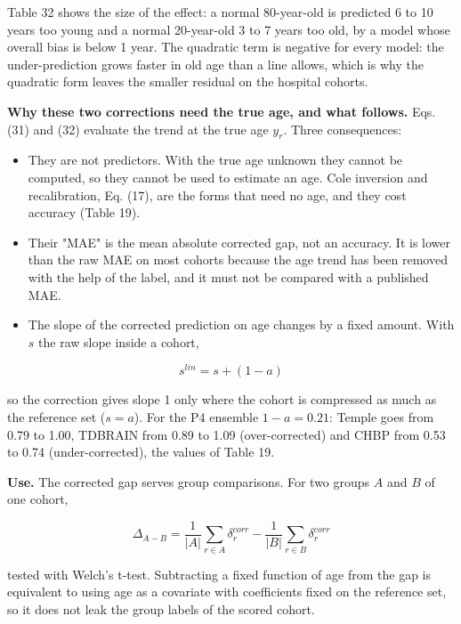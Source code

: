 \documentclass[11pt,a4paper]{article}
\begin{document}
Table 32 shows the size of the effect: a normal 80-year-old is predicted 6 to 10 years too young and a normal 20-year-old 3 to 7 years too old, by a model whose overall bias is below 1 year. The quadratic term is negative for every model: the under-prediction grows faster in old age than a line allows, which is why the quadratic form leaves the smaller residual on the hospital cohorts.

\textbf{Why these two corrections need the true age, and what follows.} Eqs. (31) and (32) evaluate the trend at the true age $y_r$. Three consequences:

\begin{itemize}
\item They are not predictors. With the true age unknown they cannot be computed, so they cannot be used to estimate an age. Cole inversion and recalibration, Eq. (17), are the forms that need no age, and they cost accuracy (Table 19).
\item Their "MAE" is the mean absolute corrected gap, not an accuracy. It is lower than the raw MAE on most cohorts because the age trend has been removed with the help of the label, and it must not be compared with a published MAE.
\item The slope of the corrected prediction on age changes by a fixed amount. With $s$ the raw slope inside a cohort,
\end{itemize}

\begin{equation}
s^{lin} = s + (1 - a) \tag{33}
\end{equation}

so the correction gives slope 1 only where the cohort is compressed as much as the reference set ($s = a$). For the P4 ensemble $1 - a = 0.21$: Temple goes from 0.79 to 1.00, TDBRAIN from 0.89 to 1.09 (over-corrected) and CHBP from 0.53 to 0.74 (under-corrected), the values of Table 19.

\textbf{Use.} The corrected gap serves group comparisons. For two groups $A$ and $B$ of one cohort,

\begin{equation}
\Delta_{A-B} = \frac{1}{\lvert A \rvert} \sum_{r \in A} \delta_r^{corr} - \frac{1}{\lvert B \rvert} \sum_{r \in B} \delta_r^{corr} \tag{34}
\end{equation}

tested with Welch's t-test. Subtracting a fixed function of age from the gap is equivalent to using age as a covariate with coefficients fixed on the reference set, so it does not leak the group labels of the scored cohort.
\end{document}
